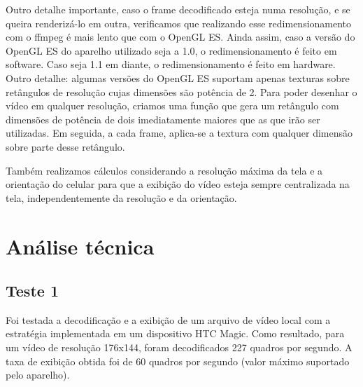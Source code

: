 \documentclass{acm_proc_article-sp}
\begin{document}
Outro detalhe importante, caso o frame decodificado esteja numa resolução, e se queira renderizá-lo em outra, verificamos que realizando esse redimensionamento com o ffmpeg é mais lento que com o OpenGL ES. Ainda assim, caso a versão do OpenGL ES do aparelho utilizado seja a 1.0, o redimensionamento é feito em software. Caso seja 1.1 em diante, o redimensionamento é feito em hardware. Outro detalhe: algumas versões do OpenGL ES suportam apenas texturas sobre retângulos de resolução cujas dimensões são potência de 2. Para poder desenhar o vídeo em qualquer resolução, criamos uma função que gera um retângulo com dimensões de potência de dois imediatamente maiores que as que irão ser utilizadas. Em seguida, a cada frame, aplica-se a textura com qualquer dimensão sobre parte desse retângulo.

Também realizamos cálculos considerando a resolução máxima da tela e a orientação do celular para que a exibição do vídeo esteja sempre centralizada na tela, independentemente da resolução e da orientação.

\section{Análise técnica}
\subsection{Teste 1}
Foi testada a decodificação e a exibição de um arquivo de vídeo local com a estratégia implementada em um dispositivo HTC Magic. Como resultado, para um vídeo de resolução 176x144, foram decodificados 227 quadros por segundo. A taxa de exibição obtida foi de 60 quadros por segundo (valor máximo suportado pelo aparelho).
\end{document}
